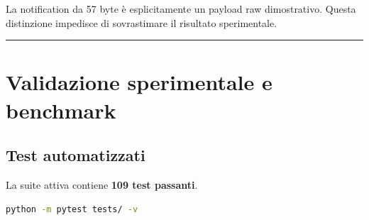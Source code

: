\documentclass[11pt,a4paper]{article}
\begin{document}
La notification da 57 byte è esplicitamente un payload raw dimostrativo.
Questa distinzione impedisce di sovrastimare il risultato sperimentale.

\begin{center}\rule{0.5\linewidth}{0.5pt}\end{center}

\section{Validazione sperimentale e benchmark}\label{capitolo-6---validazione-sperimentale-e-benchmark}

\subsection{Test automatizzati}\label{test-automatizzati}

La suite attiva contiene \textbf{109 test passanti}.

\begin{lstlisting}[language=bash]
python -m pytest tests/ -v
\end{lstlisting}
\end{document}
